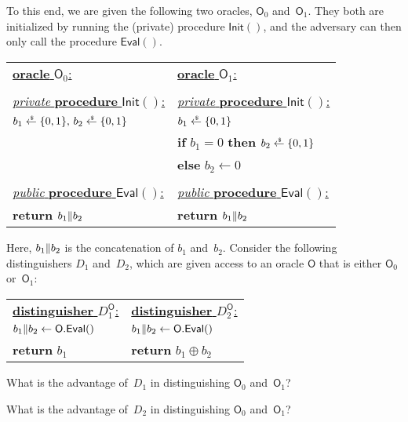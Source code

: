 \documentclass{homework}
\def\Init{{\mathsf{Init}}}
\def\Eval{{\mathsf{Eval}}}
\begin{document}
\noindent To this end, we are given the following two oracles, $\mathsf{O}_0$ and~$\mathsf{O}_1$.
They both are initialized by running the (private) procedure $\Init()$, and
the adversary can then only call the procedure $\Eval()$.
\begin{center}
\begin{tabular}{|l|l|}
\hline
\underline{\textbf{oracle }$\mathsf{O}_0$:}\rule[1.2em]{0pt}{0pt} &
\underline{\textbf{oracle }$\mathsf{O}_1$:}\rule[1.2em]{0pt}{0pt} \\
& \\
\underline{\emph{private }\textbf{procedure }$\Init()$:} &
\underline{\emph{private }\textbf{procedure }$\Init()$:} \\
${b_1\draws\bit},\,{b_2\draws\bit}$ &
${b_1\draws\bit}$ \\
&
\textbf{if }${b_1=0}$\textbf{ then }${b_2\draws\bit}$ \\
&
\textbf{else }${b_2\gets 0}$ \\
& \\
\underline{\emph{public }\textbf{procedure }$\Eval()$:} &
\underline{\emph{public }\textbf{procedure }$\Eval()$:} \\
\textbf{return }${b_1{\parallel} b_2}$\rule[-0.6em]{0pt}{0pt} &
\textbf{return }${b_1{\parallel} b_2}$\rule[-0.6em]{0pt}{0pt} \\
\hline
\end{tabular}
\end{center}
Here, ${b_1{\parallel} b_2}$ is the concatenation of $b_1$ and~$b_2$.
Consider the following distinguishers $D_1$ and~$D_2$,
which are given access to an oracle $\mathsf{O}$
that is either $\mathsf{O}_0$ or~$\mathsf{O}_1$:
\begin{center}
\begin{tabular}{|l|l|}
\hline
\underline{\textbf{distinguisher }$D_1^{\mathsf{O}}$:}\rule[1.2em]{0pt}{0pt} &
\underline{\textbf{distinguisher }$D_2^{\mathsf{O}}$:}\rule[1.2em]{0pt}{0pt} \\[4pt]
${b_1\concat b_2\gets \mathsf{O}.\Eval()}$\hspace*{5em} &
${b_1\concat b_2\gets \mathsf{O}.\Eval()}$\hspace*{5em} \\
\textbf{return }$b_1$\rule[-0.6em]{0pt}{0pt} &
\textbf{return }${b_1\oplus b_2}$\rule[-0.6em]{0pt}{0pt} \\
\hline
\end{tabular}
\end{center}
\begin{subtasks}
\item{}
What is the advantage of~$D_1$
in distinguishing $\mathsf{O}_0$ and~$\mathsf{O}_1$?
\item{}
What is the advantage of~$D_2$
in distinguishing $\mathsf{O}_0$ and~$\mathsf{O}_1$?
\end{subtasks}
\end{document}
